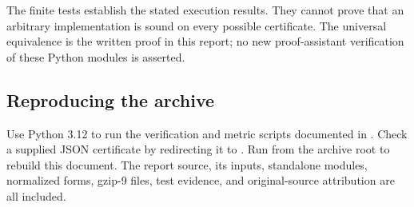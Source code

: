 The finite tests establish the stated execution results. They cannot prove
that an arbitrary implementation is sound on every possible certificate.
The universal equivalence is the written proof in this report; no new
proof-assistant verification of these Python modules is asserted.

\subsection{Reproducing the archive}

Use Python 3.12 to run the verification and metric scripts documented in
. Check a supplied JSON certificate by redirecting it to
. Run 
from the archive root to rebuild this document. The report source, its
inputs, standalone modules, normalized forms, gzip-9 files, test evidence,
and original-source attribution are all included.
